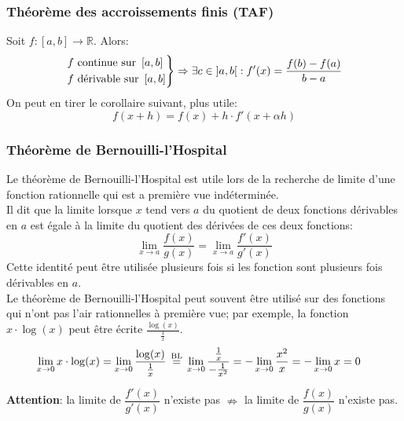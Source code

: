 \documentclass{article}
\newcommand\eqbl{\; \stackrel{ \mathclap{ \normalfont\text{BL} } }{ = } \;} %
\begin{document}
\subsubsection{Théorème des accroissements finis (TAF)}
Soit \(f : \left [a, b \right ] \to \mathbb{R}\). Alors:
\begin{equation*}
	\begin{rcases}
		f \text{ continue sur } \left [a, b \right ] \\
		f \text{ dérivable sur } \left [a, b \right ] 
	\end{rcases}
	\Rightarrow \exists c \in \left ]a, b \right [ : f'(x) = \frac{f(b) - f(a)}{b - a}
\end{equation*}
On peut en tirer le corollaire suivant, plus utile:
\begin{equation*}
	f(x + h) = f(x) + h \cdot f'(x + \alpha h)
\end{equation*}

\subsubsection{Théorème de Bernouilli-l'Hospital}
Le théorème de Bernouilli-l'Hospital est utile lors de la recherche de limite d'une fonction rationnelle qui est a première vue indéterminée. \\

Il dit que la limite lorsque \(x\) tend vers \(a\) du quotient de deux fonctions dérivables en \(a\) est égale à la limite du quotient des dérivées de ces deux fonctions:
\begin{equation*}
	\lim_{x \to a} \dfrac{f(x)}{g(x)} = \lim_{x \to a} \dfrac{f'(x)}{g'(x)}
\end{equation*}
Cette identité peut être utilisée plusieurs fois si les fonction sont plusieurs fois dérivables en \(a\). \\

Le théorème de Bernouilli-l'Hospital peut souvent être utilisé sur des fonctions qui n'ont pas l'air rationnelles à première vue; par exemple, la fonction \(x \cdot \log(x)\) peut être écrite \(\frac{\log(x)}{\frac{1}{x}}\).
\begin{align*}
	\lim_{x \to 0} x \cdot \log(x) &= \lim_{x \to 0} \frac{\log(x)}{\frac{1}{x}} 
	\eqbl \lim_{x \to 0} \frac{\frac{1}{x}}{- \frac{1}{x^2}} 
	= - \lim_{x \to 0} \frac{x^2}{x} 
	= - \lim_{x \to 0} x = 0
\end{align*}

\textbf{Attention}: la limite de \(\dfrac{f'(x)}{g'(x)}\) n'existe pas \(\nRightarrow\) la limite de \(\dfrac{f(x)}{g(x)}\) n'existe pas.
\end{document}
